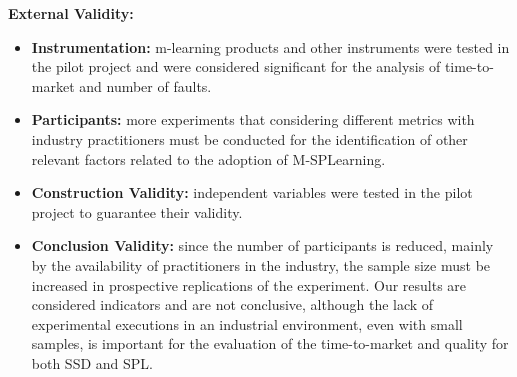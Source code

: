 \textbf{External Validity:}

\begin{itemize}

\item \textbf{Instrumentation:} m-learning products and other instruments were tested in the pilot project and were considered significant for the analysis of time-to-market and number of faults.

\item \textbf{Participants:} more experiments that considering different metrics with industry practitioners must be conducted for the identification of other relevant factors related to the adoption of M-SPLear\allowbreak ning.

\end{itemize}

\begin{itemize}

\item \textbf{Construction Validity:} independent variables were tested in the pilot project to guarantee their validity.

\item \textbf{Conclusion Validity:} since the number of participants is reduced, mainly by the availability of practitioners in the industry, the sample size must be increased in prospective replications of the experiment. Our results are considered indicators and are not conclusive, although the lack of experimental executions in an industrial environment, even with small samples, is important for the evaluation of the time-to-market and quality for both SSD and SPL.

\end{itemize}

